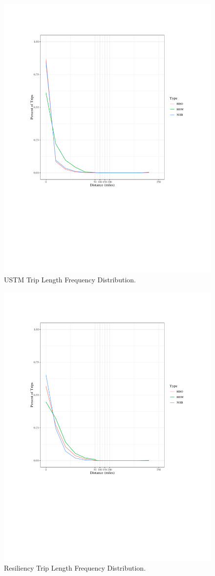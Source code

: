\begin{figure}

{\centering \includegraphics[width=0.75\linewidth]{figures/chapter3/ustm_tlfd.pdf}

}

\caption{USTM Trip Length Frequency Distribution.}\label{fig:ustm_tlfd}
\end{figure}

\begin{figure}

{\centering \includegraphics[width=0.75\linewidth]{figures/chapter3/resiliency_tlfd.pdf}

}

\caption{Resiliency Trip Length Frequency Distribution.}\label{fig:resiliency_tlfd}
\end{figure}

